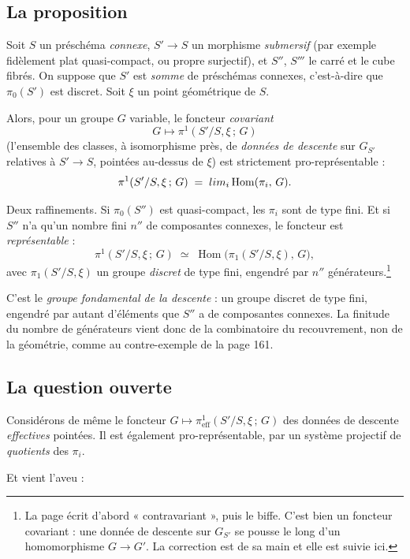 \documentclass[11pt,a4paper]{article}
\begin{document}
\subsection*{La proposition}

Soit $S$ un préschéma \emph{connexe}, $S' \to S$ un morphisme
\emph{submersif} (par exemple fidèlement plat quasi-compact, ou propre
surjectif), et $S''$, $S'''$ le carré et le cube fibrés. On suppose que $S'$
est \emph{somme} de préschémas connexes, c'est-à-dire que $\pi_{0}(S')$ est
discret. Soit $\xi$ un point géométrique de $S$.

Alors, pour un groupe $G$ variable, le foncteur \emph{covariant}
\[
  G \longmapsto \pi^{1}(S'/S, \xi\,;\, G)
\]
(l'ensemble des classes, à isomorphisme près, de \emph{données de descente}
sur $G_{S'}$ relatives à $S' \to S$, pointées au-dessus de $\xi$) est
strictement pro-représentable :
\[
  \pi^{1}(S'/S, \xi\,;\, G) \;=\; \varinjlim_{i}
  \operatorname{Hom}(\pi_{i},\, G) .
\]

Deux raffinements. Si $\pi_{0}(S'')$ est quasi-compact, les $\pi_{i}$ sont de
type fini. Et si $S''$ n'a qu'un nombre fini $n''$ de composantes connexes, le
foncteur est \emph{représentable} :
\[
  \pi^{1}(S'/S, \xi\,;\, G) \;\simeq\;
  \operatorname{Hom}\bigl(\pi_{1}(S'/S, \xi),\, G\bigr) ,
\]
avec $\pi_{1}(S'/S,\xi)$ un groupe \emph{discret} de type fini, engendré par
$n''$ générateurs.\footnote{La page écrit d'abord « contravariant », puis le
biffe. C'est bien un foncteur covariant : une donnée de descente sur $G_{S'}$
se pousse le long d'un homomorphisme $G \to G'$. La correction est de sa main
et elle est suivie ici.}

C'est le \emph{groupe fondamental de la descente} : un groupe discret de type
fini, engendré par autant d'éléments que $S''$ a de composantes connexes. La
finitude du nombre de générateurs vient donc de la combinatoire du
recouvrement, non de la géométrie, comme au contre-exemple de la
page 161.

\subsection*{La question ouverte}

Considérons de même le foncteur
$G \mapsto \pi^{1}_{\mathrm{eff}}(S'/S, \xi\,;\, G)$ des données de descente
\emph{effectives} pointées. Il est également pro-représentable, par un système
projectif de \emph{quotients} des $\pi_{i}$.

Et vient l'aveu :
\end{document}
